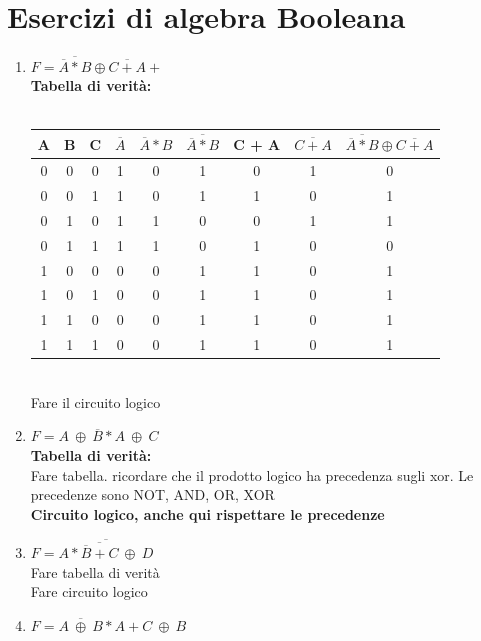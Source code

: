 \documentclass[12pt]{report}
\begin{document}
		\chapter{Esercizi di algebra Booleana}
		\begin{enumerate}
			\item $F = \overline{\overline{A} * B} \oplus \overline{C + A} + $
			\\ \textbf{Tabella di verità: }
			\\
			\\
			\begin{tabular}{c|c|c|c|c|c|c|c|c}
				A & B & C & $\overline{A}$ & $\overline{A} * B$& $\overline{\overline{A} * B}$& C + A & $\overline{C + A}$ & $ \overline{\overline{A} * B} \oplus \overline{C + A}$ \\
				\hline
				0 & 0 & 0 & 1 & 0 & 1 & 0 & 1 & 0 \\
				0 & 0 & 1 & 1 & 0 & 1 & 1 & 0 & 1 \\
				0 & 1 & 0 & 1 & 1 & 0 & 0 & 1 & 1 \\
				0 & 1 & 1 & 1 & 1 & 0 & 1 & 0 & 0 \\
				1 & 0 & 0 & 0 & 0 & 1 & 1 & 0 & 1 \\
				1 & 0 & 1 & 0 & 0 & 1 & 1 & 0 & 1 \\
				1 & 1 & 0 & 0 & 0 & 1 & 1 & 0 & 1 \\
				1 & 1 & 1 & 0 & 0 & 1 & 1 & 0 & 1 \\
			\end{tabular}
			\\ Fare il circuito logico
			\item $F = A \ \oplus \ \overline{B} * A \ \oplus \ C$
			\\ \textbf{Tabella di verità: }
			\\ Fare tabella. ricordare che il prodotto logico ha precedenza sugli xor. Le precedenze sono NOT, AND, OR, XOR
			\\ \textbf{Circuito logico, anche qui rispettare le precedenze}
			\item $F = \overline{A * \overline{\overline{B} + C} \ \oplus \ D}$
			\\ Fare tabella di verità
			\\ Fare circuito logico
			\item $F = \overline{A \ \oplus \ B} * A + C \ \oplus \ B $
		\end{enumerate}
\end{document}
